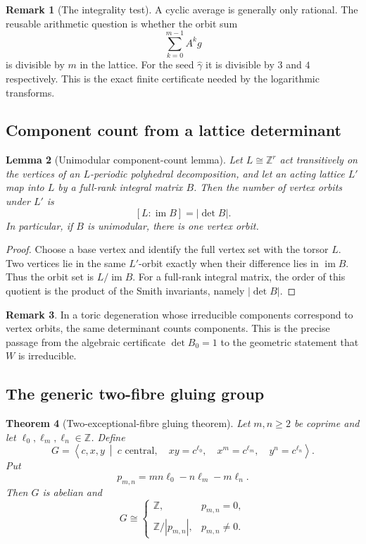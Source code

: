 \documentclass[11pt,reqno]{amsart}
\numberwithin{equation}{section}
\newcommand{\Z}{\mathbb Z}
\newcommand{\im}{\operatorname{im}}
\newcommand{\wideg}{\widehat\gamma}
\newtheorem{theorem}{Theorem}[section]
\newtheorem{lemma}[theorem]{Lemma}
\theoremstyle{definition}
\newtheorem{remark}[theorem]{Remark}
\begin{document}
\begin{remark}[The integrality test]
A cyclic average is generally only rational. The reusable arithmetic question is whether the orbit sum
\[
\sum_{k=0}^{m-1}A^kg
\]
is divisible by $m$ in the lattice. For the seed $\wideg$ it is divisible by $3$ and $4$ respectively. This is the exact finite certificate needed by the logarithmic transforms.
\end{remark}

\subsection{Component count from a lattice determinant}

\begin{lemma}[Unimodular component-count lemma]\label{lem:component-index}
Let $L\cong\Z^r$ act transitively on the vertices of an $L$-periodic polyhedral decomposition, and let an acting lattice $L'$ map into $L$ by a full-rank integral matrix $B$. Then the number of vertex orbits under $L'$ is
\[
[L:\im B]=|\det B|.
\]
In particular, if $B$ is unimodular, there is one vertex orbit.
\end{lemma}

\begin{proof}
Choose a base vertex and identify the full vertex set with the torsor $L$. Two vertices lie in the same $L'$-orbit exactly when their difference lies in $\im B$. Thus the orbit set is $L/\im B$. For a full-rank integral matrix, the order of this quotient is the product of the Smith invariants, namely $|\det B|$.
\end{proof}

\begin{remark}
In a toric degeneration whose irreducible components correspond to vertex orbits, the same determinant counts components. This is the precise passage from the algebraic certificate $\det B_0=1$ to the geometric statement that $W$ is irreducible.
\end{remark}

\subsection{The generic two-fibre gluing group}

\begin{theorem}[Two-exceptional-fibre gluing theorem]\label{thm:gluing-group}
Let $m,n\ge2$ be coprime and let $\ell_0,\ell_m,\ell_n\in\Z$. Define
\[
G=\left\langle c,x,y\ \middle|\
 c\text{ central},\quad
 xy=c^{\ell_0},\quad
 x^m=c^{\ell_m},\quad
 y^n=c^{\ell_n}
\right\rangle.
\]
Put
\begin{equation}\label{eq:general-defect}
p_{m,n}=mn\ell_0-n\ell_m-m\ell_n.
\end{equation}
Then $G$ is abelian and
\[
G\cong
\begin{cases}
\Z,&p_{m,n}=0,\\
\Z/|p_{m,n}|,&p_{m,n}\ne0.
\end{cases}
\]
\end{theorem}
\end{document}
